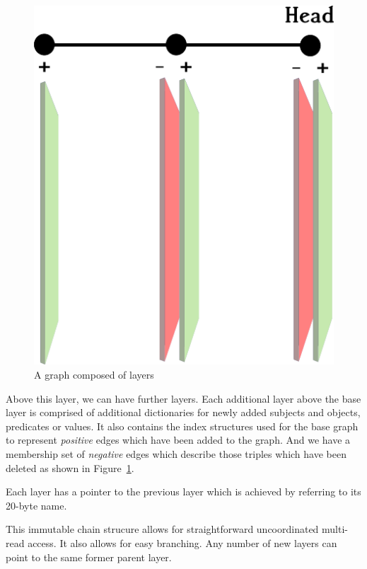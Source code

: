 \documentclass[10pt, a4paper, twocolumn]{article} %
\begin{document}
\begin{figure}
	\includegraphics[width=\linewidth]{layers-diagram.png} %
	\caption{A graph composed of layers} %
	\label{fig:layers} %
\end{figure}

Above this layer, we can have further layers. Each additional layer
above the base layer is comprised of additional dictionaries for newly
added subjects and objects, predicates or values. It also contains the
index structures used for the base graph to represent {\em positive}
edges which have been added to the graph. And we have a membership set
of {\em negative} edges which describe those triples which have been
deleted as shown in Figure~\ref{fig:layers}.

Each layer has a pointer to the previous layer which is achieved by
referring to its 20-byte name.

This immutable chain strucure allows for straightforward uncoordinated
multi-read access. It also allows for easy branching. Any number of
new layers can point to the same former parent layer.
\end{document}
